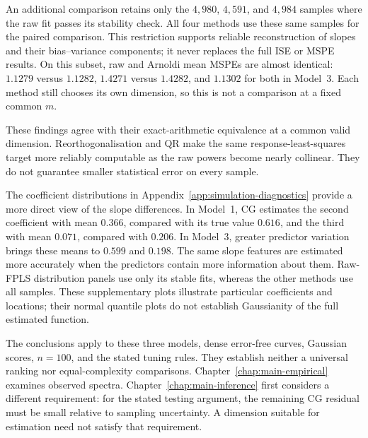 An additional comparison retains only the $4{,}980$, $4{,}591$, and
$4{,}984$ samples where the raw fit passes its stability check. All four
methods use these same samples for the paired comparison. This restriction
supports reliable reconstruction of slopes and their bias--variance
components; it never replaces the full ISE or MSPE results.
On this subset, raw and Arnoldi mean MSPEs are almost identical:
$1.1279$ versus $1.1282$, $1.4271$ versus $1.4282$, and $1.1302$
for both in Model~3. Each method still chooses its own dimension,
so this is not a comparison at a fixed common $m$.

These findings agree with their exact-arithmetic equivalence at a
common valid dimension. Reorthogonalisation and QR make the same
response-least-squares target more reliably computable as the raw powers
become nearly collinear. They do not guarantee smaller statistical error
on every sample.

The coefficient distributions in Appendix~\ref{app:simulation-diagnostics}
provide a more direct view of the slope differences. In Model~1, CG
estimates the second coefficient with mean $0.366$, compared with its
true value $0.616$, and the third with mean $0.071$, compared with
$0.206$. In Model~3, greater predictor variation brings these means to
$0.599$ and $0.198$. The same slope features are estimated more accurately
when the predictors contain more information about them. Raw-FPLS
distribution panels use only its stable fits, whereas the other methods
use all samples. These supplementary plots illustrate particular
coefficients and locations; their normal quantile plots do not establish
Gaussianity of the full estimated function.

The conclusions apply to these three models, dense error-free curves,
Gaussian scores, $n=100$, and the stated tuning rules. They establish
neither a universal ranking nor equal-complexity comparisons.
Chapter~\ref{chap:main-empirical} examines observed spectra.
Chapter~\ref{chap:main-inference} first considers a different requirement:
for the stated testing argument, the remaining CG residual must be small
relative to sampling uncertainty. A dimension suitable for estimation
need not satisfy that requirement.
